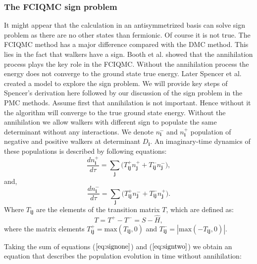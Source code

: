 \documentclass[twoside,english]{uiofysmaster}
\begin{document}
\subsubsection{The FCIQMC sign problem}
It might appear that the calculation in an antisymmetrized basis can
solve sign problem as there are no other states than fermionic. Of
course it is not true.  The FCIQMC method has a major difference
compared with the DMC method. This lies in the fact that walkers have a
sign. Booth et al. \cite{BoothFermionMonteCarlo2009} showed that
the annihilation process plays the key role in the FCIQMC. Without the
annihilation process the energy does not converge to the ground state
true energy. Later Spencer et
al. \cite{Spencersignproblempopulation2012} created a model to explore
the sign problem. We will provide key steps of Spencer's derivation
here followed by our discussion of the sign problem in the PMC methods.
Assume first that annihilation is not
important. Hence without it the algorithm will converge to the true
ground state energy. Without the annihilation we allow walkers with
different sign to populate the same determinant without any
interactions. We denote $n_{\boldsymbol{i}}^-$ and
$n_{\boldsymbol{i}}^+$ population of negative and positive walkers at
determinant $D_{\boldsymbol{i}}$. An imaginary-time dynamics of these
populations is described by following equations:
\begin{equation}\label{eq:signone}
\frac{d n_{\boldsymbol{i}}^+}{d \tau}=\sum_{\boldsymbol{j}}\big(T_{\boldsymbol{ij}}^+n_{\boldsymbol{j}}^+  + T_{\boldsymbol{ij}}^-n_{\boldsymbol{j}}^-\big),
\end{equation}
and,
\begin{equation}\label{eq:signtwo}
\frac{d n_{\boldsymbol{i}}^-}{d \tau}=\sum_{\boldsymbol{j}}\big(T_{\boldsymbol{ij}}^+n_{\boldsymbol{j}}^- +  T_{\boldsymbol{ij}}^-n_{\boldsymbol{j}}^+\big).
\end{equation}
Where $T_{\boldsymbol{ij}}$ are the elements of the transition matrix $T$, which are defined as:
\begin{equation}
T = T^+ - T^- = S - \hat{H},
\end{equation}
where the matrix elements $T_{\boldsymbol{ij}}^+ = \text{max}(T_{\boldsymbol{ij}},0)$ and $T_{\boldsymbol{ij}}^- = |\text{max}(-T_{\boldsymbol{ij}},0)|$.

Taking the sum of equations ($\ref{eq:signone}$) and ($\ref{eq:signtwo}$) we obtain an equation that describes the  population evolution in time without annihilation: 
\end{document}
